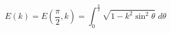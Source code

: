 \documentclass[12pt]{article}
\begin{document}
\begin{displaymath}
E(k) = E(\frac{\pi}{2}, k) = \int_0^\frac{\pi}{2} \sqrt{1-k^2\sin^2\theta} \; d\theta
\end{displaymath}
\end{document}
